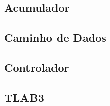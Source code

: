 \vspace*{\fill}

\vspace*{\fill}%

\subsection{Acumulador}
\vspace*{\fill}

\vspace*{\fill}%

\subsection{Caminho de Dados}
\vspace*{\fill}

\vspace*{\fill}%

\subsection{Controlador}
\vspace*{\fill}

\vspace*{\fill}%

\subsection{TLAB3}
\vspace*{\fill}

\vspace*{\fill}%

\newpage

\vspace*{\fill}

\vspace*{\fill}%
